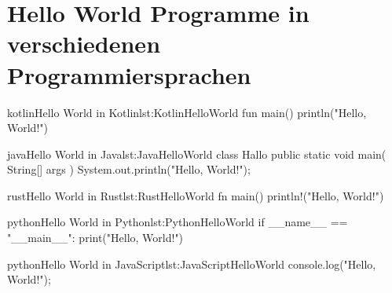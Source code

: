 

\chapter{Hello World Programme in verschiedenen Programmiersprachen}
\label{ch:HelloWorldProgrammeInVerschiedenenProgrammiersprachen}

\begin{code}{kotlin}{Hello World in Kotlin}{lst:KotlinHelloWorld}
    fun main() {
        println("Hello, World!")
    }
\end{code}

\begin{code}{java}{Hello World in Java}{lst:JavaHelloWorld}
    class Hallo {
        public static void main( String[] args ) {
            System.out.println("Hello, World!");
        }
    }
\end{code}

\begin{code}{rust}{Hello World in Rust}{lst:RustHelloWorld}
    fn main() {
        println!("Hello, World!")
    }
\end{code}

\begin{code}{python}{Hello World in Python}{lst:PythonHelloWorld}
    if __name__ == "__main__":
        print("Hello, World!")
\end{code}

\begin{code}{python}{Hello World in JavaScript}{lst:JavaScriptHelloWorld}
    console.log("Hello, World!");
\end{code}
